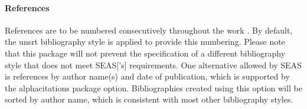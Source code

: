 \documentclass[10pt]{article}
\newcommand{\option}[1]{#1}
\begin{document}
\paragraph{References}
References are to be numbered consecutively throughout the work \cite{seas:instructions}.
By default, the unsrt bibliography style is applied to provide this numbering.
Please note that this package will not prevent the specification of a different bibliography style that does not meet \gls{SEAS}['s] requirements.
One alternative allowed by \gls{SEAS} is references by author name(s) and date of publication, which is supported by the \option{alphacitations} package option.
Bibliographies created using this option will be sorted by author name, which is consistent with most other bibliography styles.

\raggedright


\end{document}
